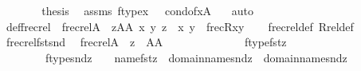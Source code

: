 \begin{isabellebody}
\isanewline
\ \ \ \ \isamarkupfalse%
\ \isamarkupfalse%
\ {\isacharquery}{\kern0pt}thesis\ \isamarkupfalse%
\ assms{\isacharparenleft}{\kern0pt}{}{\isacharparenright}{\kern0pt}\ {\isacartoucheopen}ftype{\isacharparenleft}{\kern0pt}x{\isacharparenright}{\kern0pt}\ {\isacharequal}{\kern0pt}\ {}{\isacartoucheclose}\ {\isacartoucheopen}cond{\isacharunderscore}{\kern0pt}of{\isacharparenleft}{\kern0pt}x{\isacharparenright}{\kern0pt}{\isasymin}A{}{\isacartoucheclose}\ \ \isamarkupfalse%
\ auto\isanewline
\ \ \isamarkupfalse%
\isanewline
{}\isamarkupfalse%
%
\endisatagproof
{\isafoldproof}%
%
\isadelimproof
\isanewline
%
\endisadelimproof
\isanewline
{}\isamarkupfalse%
\ def{\isacharunderscore}{\kern0pt}frecrel\ {\isacharcolon}{\kern0pt}\ {\isachardoublequoteopen}frecrel{\isacharparenleft}{\kern0pt}A{\isacharparenright}{\kern0pt}\ {\isacharequal}{\kern0pt}\ {\isacharbraceleft}{\kern0pt}z{\isasymin}A{\isasymtimes}A{\isachardot}{\kern0pt}\ {\isasymexists}x\ y{\isachardot}{\kern0pt}\ z\ {\isacharequal}{\kern0pt}\ {\isasymlangle}x{\isacharcomma}{\kern0pt}\ y{\isasymrangle}\ {\isasymand}\ frecR{\isacharparenleft}{\kern0pt}x{\isacharcomma}{\kern0pt}y{\isacharparenright}{\kern0pt}{\isacharbraceright}{\kern0pt}{\isachardoublequoteclose}\isanewline
%
\isadelimproof
\ \ %
\endisadelimproof
%
\isatagproof
{}\isamarkupfalse%
\ frecrel{\isacharunderscore}{\kern0pt}def\ Rrel{\isacharunderscore}{\kern0pt}def\ \isacommand{{\isachardot}{\kern0pt}{\isachardot}{\kern0pt}}\isamarkupfalse%
%
\endisatagproof
{\isafoldproof}%
%
\isadelimproof
\isanewline
%
\endisadelimproof
\isanewline
{}\isamarkupfalse%
\ frecrel{\isacharunderscore}{\kern0pt}fst{\isacharunderscore}{\kern0pt}snd{\isacharcolon}{\kern0pt}\isanewline
\ \ {\isachardoublequoteopen}frecrel{\isacharparenleft}{\kern0pt}A{\isacharparenright}{\kern0pt}\ {\isacharequal}{\kern0pt}\ {\isacharbraceleft}{\kern0pt}z\ {\isasymin}\ A{\isasymtimes}A\ {\isachardot}{\kern0pt}\ \isanewline
\ \ \ \ \ \ \ \ \ \ \ \ ftype{\isacharparenleft}{\kern0pt}fst{\isacharparenleft}{\kern0pt}z{\isacharparenright}{\kern0pt}{\isacharparenright}{\kern0pt}\ {\isacharequal}{\kern0pt}\ {}\ {\isasymand}\ \isanewline
\ \ \ \ \ \ \ \ ftype{\isacharparenleft}{\kern0pt}snd{\isacharparenleft}{\kern0pt}z{\isacharparenright}{\kern0pt}{\isacharparenright}{\kern0pt}\ {\isacharequal}{\kern0pt}\ {}\ {\isasymand}\ name{}{\isacharparenleft}{\kern0pt}fst{\isacharparenleft}{\kern0pt}z{\isacharparenright}{\kern0pt}{\isacharparenright}{\kern0pt}\ {\isasymin}\ domain{\isacharparenleft}{\kern0pt}name{}{\isacharparenleft}{\kern0pt}snd{\isacharparenleft}{\kern0pt}z{\isacharparenright}{\kern0pt}{\isacharparenright}{\kern0pt}{\isacharparenright}{\kern0pt}\ {\isasymunion}\ domain{\isacharparenleft}{\kern0pt}name{}{\isacharparenleft}{\kern0pt}snd{\isacharparenleft}{\kern0pt}z{\isacharparenright}{\kern0pt}{\isacharparenright}{\kern0pt}{\isacharparenright}{\kern0pt}\ {\isasymand}\ \isanewline

\end{isabellebody}
